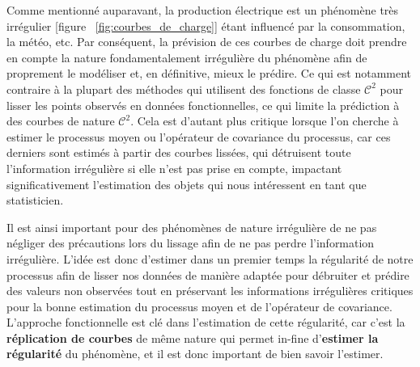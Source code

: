Comme mentionné auparavant, la production électrique est un phénomène très irrégulier [figure ~\ref{fig:courbes_de_charge}] étant influencé par la consommation, la météo, etc. Par conséquent, la prévision de ces courbes de charge doit prendre en compte la nature fondamentalement irrégulière du phénomène afin de proprement le modéliser et, en définitive, mieux le prédire. Ce qui est notamment contraire à la plupart des méthodes qui utilisent des fonctions de classe $\mathcal C^2$ pour lisser les points observés en données fonctionnelles, ce qui limite la prédiction à des courbes de nature $\mathcal C^2$. Cela est d'autant plus critique lorsque l'on cherche à estimer le processus moyen ou l'opérateur de covariance du processus, car ces derniers sont estimés à partir des courbes lissées, qui détruisent toute l'information irrégulière si elle n'est pas prise en compte, impactant significativement l'estimation des objets qui nous intéressent en tant que statisticien.




Il est ainsi important pour des phénomènes de nature irrégulière de ne pas négliger des précautions lors du lissage afin de ne pas perdre l'information irrégulière. L'idée est donc d'estimer dans un premier temps la régularité de notre processus afin de lisser nos données de manière adaptée pour débruiter et prédire des valeurs non observées tout en préservant les informations irrégulières critiques pour la bonne estimation du processus moyen et de l'opérateur de covariance. L'approche fonctionnelle est clé dans l'estimation de cette régularité, car c'est la \textbf{réplication de courbes} de même nature qui permet in-fine d'\textbf{estimer la régularité} du phénomène, et il est donc important de bien savoir l'estimer.
